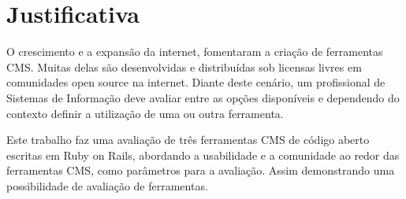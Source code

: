 \section{Justificativa}
 
O crescimento e a expansão da internet, fomentaram a criação de ferramentas CMS. Muitas delas são desenvolvidas e distribuídas sob licensas livres em comunidades open source na internet. Diante deste cenário, um profissional de Sistemas de Informação deve avaliar entre as opções disponíveis e dependendo do contexto definir a utilização de uma ou outra ferramenta.

Este trabalho faz uma avaliação de três ferramentas CMS de código aberto escritas em Ruby on Rails,  abordando a usabilidade e a comunidade ao redor das ferramentas CMS, como parâmetros para a avaliação. Assim demonstrando uma possibilidade de avaliação de ferramentas.





    
